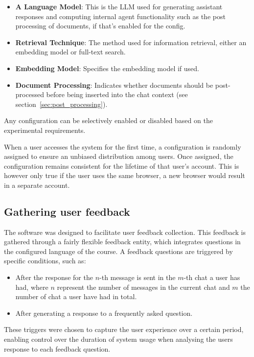 \begin{itemize}
        \item \textbf{A Language Model}: This is the \gls{LLM} used for generating assistant responses and computing internal agent functionality such as the post processing of documents, if that’s enabled for the config.
        \item \textbf{Retrieval Technique}: The method used for information retrieval, either an embedding model or full-text search.
        \item \textbf{Embedding Model}: Specifies the embedding model if used.
        \item \textbf{Document Processing}: Indicates whether documents should be post-processed before being inserted into the chat context (see section~\ref{sec:post_processing}).
\end{itemize}


Any configuration can be selectively enabled or disabled based on the experimental requirements.

When a user accesses the system for the first time, a configuration is randomly assigned to ensure an unbiased distribution among users. Once assigned, the configuration remains consistent for the lifetime of that user’s account. This is however only true if the user uses the same browser, a new browser would result in a separate account.


\subsection{Gathering user feedback}
\label{sec:what_you_did_gathering_feedback_data}


The software was designed to facilitate user feedback collection. This feedback is gathered through a fairly flexible feedback entity, which integrates questions in the configured language of the course. A feedback questions are triggered by specific conditions, such as:


\begin{itemize}
\item After the response for the $n$-th message is sent in the $m$-th chat a user has had, where $n$ represent the number of messages in the current chat and $m$ the number of chat a user have had in total.
\item After generating a response to a frequently asked question.
\end{itemize}


These triggers were chosen to capture the user experience over a certain period, enabling control over the duration of system usage when analysing the users response to each feedback question.



